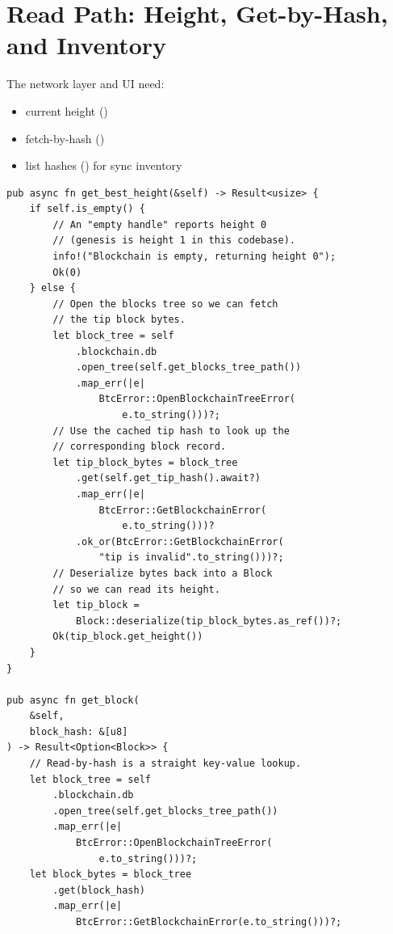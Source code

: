 \section{Read Path: Height, Get-by-Hash, and Inventory}
\label{sec:ch11-read-path}

The network layer and UI need:

\begin{itemize}
  \item current height ()
  \item fetch-by-hash ()
  \item list hashes () for sync inventory
\end{itemize}

\begin{listing}[htbp]
\caption{Read path operations}
\label{lst:ch11-read}
\begin{verbatim}
pub async fn get_best_height(&self) -> Result<usize> {
    if self.is_empty() {
        // An "empty handle" reports height 0
        // (genesis is height 1 in this codebase).
        info!("Blockchain is empty, returning height 0");
        Ok(0)
    } else {
        // Open the blocks tree so we can fetch
        // the tip block bytes.
        let block_tree = self
            .blockchain.db
            .open_tree(self.get_blocks_tree_path())
            .map_err(|e|
                BtcError::OpenBlockchainTreeError(
                    e.to_string()))?;
        // Use the cached tip hash to look up the
        // corresponding block record.
        let tip_block_bytes = block_tree
            .get(self.get_tip_hash().await?)
            .map_err(|e|
                BtcError::GetBlockchainError(
                    e.to_string()))?
            .ok_or(BtcError::GetBlockchainError(
                "tip is invalid".to_string()))?;
        // Deserialize bytes back into a Block
        // so we can read its height.
        let tip_block =
            Block::deserialize(tip_block_bytes.as_ref())?;
        Ok(tip_block.get_height())
    }
}

pub async fn get_block(
    &self,
    block_hash: &[u8]
) -> Result<Option<Block>> {
    // Read-by-hash is a straight key-value lookup.
    let block_tree = self
        .blockchain.db
        .open_tree(self.get_blocks_tree_path())
        .map_err(|e|
            BtcError::OpenBlockchainTreeError(
                e.to_string()))?;
    let block_bytes = block_tree
        .get(block_hash)
        .map_err(|e|
            BtcError::GetBlockchainError(e.to_string()))?;


\end{verbatim}
\end{listing}
